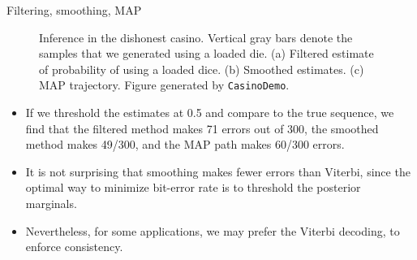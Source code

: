 \documentclass[10pt,mathserif]{beamer}
\begin{document}
\begin{frame}{Filtering, smoothing, MAP}
\begin{figure}[h]
\centering     %
{}
\caption{Inference in the dishonest casino. Vertical gray bars denote the samples that we generated using a loaded die. (a) Filtered estimate of probability of using a loaded dice. (b) Smoothed estimates. (c) MAP trajectory. Figure generated by \texttt{CasinoDemo}.}
\end{figure}

\begin{itemize}\footnotesize
    \item If we threshold the estimates at 0.5 and compare to the true sequence, we find that the filtered method makes 71 errors out of 300, the smoothed method makes 49/300, and the MAP path makes 60/300 errors.
    \item It is not surprising that smoothing makes fewer errors than Viterbi, since the optimal way to minimize bit-error rate is to threshold the posterior marginals.
    \item Nevertheless, for some applications, we may prefer the Viterbi decoding, to enforce consistency.
\end{itemize}
\end{frame}
\end{document}
